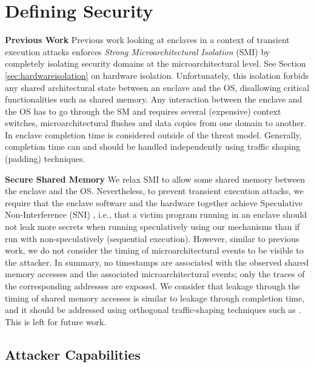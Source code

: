 \section{Defining Security}
\label{sec:threatmodel}

\noindent\textbf{Previous Work}
Previous work looking at enclaves in a context of transient execution attacks \cite{bourgeat2019mi6}
enforces \emph{Strong Microarchitectural Isolation} (SMI) by completely isolating security domains at the microarchitectural level.
See Section \ref{sec:hardwareisolation} on hardware isolation.
Unfortunately, this isolation forbids any shared architectural state between an enclave and the OS, disallowing critical functionalities such as shared memory.
Any interaction between the enclave and the OS has to go through the SM and requires several (expensive) context switches, microarchitectural flushes and data copies from one domain to another.
In \cite{bourgeat2019mi6} enclave completion time is considered outside of the threat model. Generally,
completion time can and should be handled independently using traffic shaping (padding) techniques.

\noindent\textbf{Secure Shared Memory}
We relax SMI to allow some shared memory between the enclave and the OS.
Nevertheless, to prevent transient execution attacks, we require that the enclave software and the hardware together achieve Speculative Non-Interference (SNI) \cite{guarnieri2020spectector, guarnieri2021hardware, behnia2021speculative, fabian2022automatic, yu2019speculative, yu2019speculative2}, i.e., that a victim program running in an enclave should not leak more secrets when running speculatively using our mechanisms than if run with non-speculatively (sequential execution).
However, similar to previous work, we do not consider the timing of microarchitectural events to be visible to the attacker.
In summary, no timestamps are associated with the observed shared memory accesses and the associated microarchitectural events; only the traces of the corresponding addresses are exposed.
We consider that leakage through the timing of shared memory accesses is similar to leakage through completion time, and it should be addressed using orthogonal traffic-shaping techniques such as \cite{deutsch2022dagguise, wang2014timing, shafiee2015avoiding, zhou2017camouflage}. This is left for future work.


\subsection{Attacker Capabilities}

